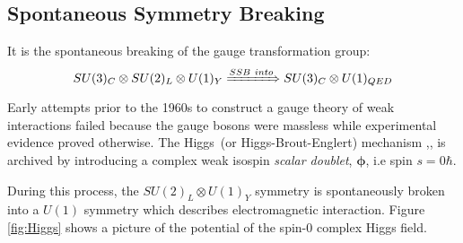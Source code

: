 \subsection{Spontaneous Symmetry Breaking}
It is the spontaneous breaking of the gauge transformation group:
\begin{equation}
 SU(3)_{C} \otimes SU(2)_{L} \otimes U(1)_{Y} \xRightarrow{SSB~into} SU(3)_C \otimes U(1)_{QED}
\end{equation}
Early attempts prior to the 1960s to construct a gauge theory of weak interactions failed because the gauge bosons were massless while experimental evidence proved otherwise.
\newline
The Higgs~(or Higgs-Brout-Englert) mechanism ,\cite{HIGGS}, is archived by introducing a complex weak isospin \textit{scalar doublet}, $\mathbf{\phi}$, i.e spin $s = 0\hbar$.


During this process, the  $SU(2)_{L} \otimes U(1)_{Y}$ symmetry is spontaneously broken into a $U(1)$ symmetry  which describes electromagnetic interaction. Figure \ref{fig:Higgs} shows a picture of the potential of the spin-$0$ complex Higgs field.


